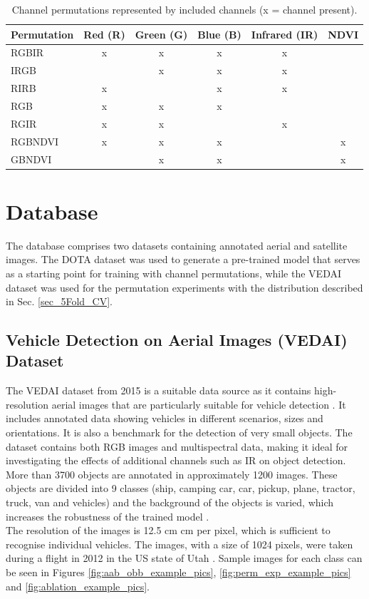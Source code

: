 \begin{table}[h!]
\centering
\begin{tabular}{l|c|c|c|c|c}
\textbf{Permutation} & \textbf{Red (R)} & \textbf{Green (G)} & \textbf{Blue (B)} & \textbf{Infrared (IR)} & \textbf{NDVI} \\
\hline
\acrshort{RGBIR}    & x & x & x & x &   \\
\acrshort{IRGB}     &   & x & x & x &   \\
\acrshort{RIRB}     & x &   & x & x &   \\
\acrshort{RGB}      & x & x & x &   &   \\
\acrshort{RGIR}     & x & x &   & x &   \\
\acrshort{RGBNDVI}  & x & x & x &   & x \\
\acrshort{GBNDVI}   &   & x & x &   & x \\
\end{tabular}
\caption{Channel permutations represented by included channels (x = channel present).}
\label{tab:perm}
\end{table}

\section{Database}
The database comprises two datasets containing annotated aerial and satellite images. The \acrshort{DOTA} dataset was used to generate a pre-trained model that serves as a starting point for training with channel permutations, while the \acrshort{VEDAI} dataset was used for the permutation experiments with the distribution described in Sec. \ref{sec_5Fold_CV}.
\subsection{Vehicle Detection on Aerial Images (VEDAI) Dataset}
\label{subsec:VEDAI}

The \Acrshort{VEDAI} dataset \cite{vedai_web}  from 2015 is a suitable data source as it contains high-resolution aerial images that are particularly suitable for vehicle detection \cite{Razakarivony2015}. It includes annotated data showing vehicles in different scenarios, sizes and orientations. It is also a benchmark for the detection of very small objects. The dataset contains both \acrshort{RGB} images and multispectral data, making it ideal for investigating the effects of additional channels such as \acrshort{IR} on object detection. More than 3700 objects are annotated in approximately 1200 images. These objects are divided into 9 classes (ship, camping car, car, pickup, plane, tractor, truck, van and vehicles) and the background of the objects is varied, which increases the robustness of the trained model \cite{Razakarivony2015}. \\
The resolution of the images is 12.5 cm  cm per pixel, which is sufficient to recognise individual vehicles. The images, with a size of 1024  pixels, were taken during a flight in 2012 in the US state of Utah \cite{Razakarivony2015}. Sample images for each class can be seen in Figures \ref{fig:aab_obb_example_pics}, \ref{fig:perm_exp_example_pics} and \ref{fig:ablation_example_pics}.



